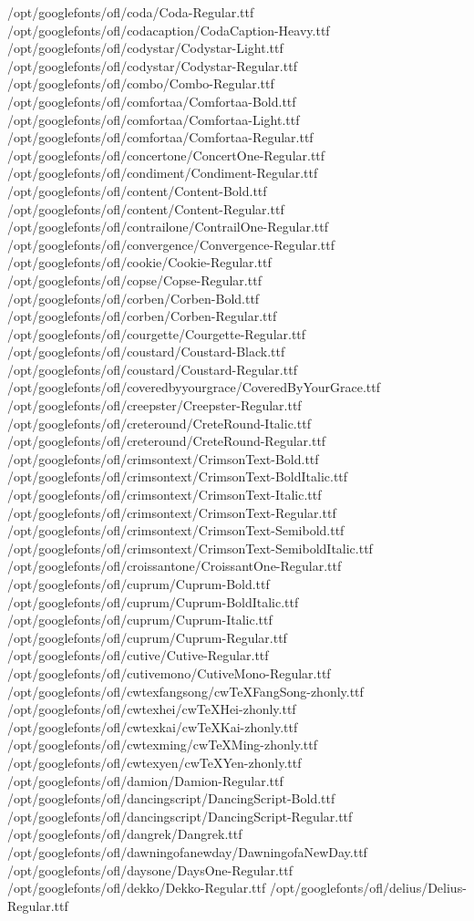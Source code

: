 /opt/googlefonts/ofl/coda/Coda-Regular.ttf
/opt/googlefonts/ofl/codacaption/CodaCaption-Heavy.ttf
/opt/googlefonts/ofl/codystar/Codystar-Light.ttf
/opt/googlefonts/ofl/codystar/Codystar-Regular.ttf
/opt/googlefonts/ofl/combo/Combo-Regular.ttf
/opt/googlefonts/ofl/comfortaa/Comfortaa-Bold.ttf
/opt/googlefonts/ofl/comfortaa/Comfortaa-Light.ttf
/opt/googlefonts/ofl/comfortaa/Comfortaa-Regular.ttf
/opt/googlefonts/ofl/concertone/ConcertOne-Regular.ttf
/opt/googlefonts/ofl/condiment/Condiment-Regular.ttf
/opt/googlefonts/ofl/content/Content-Bold.ttf
/opt/googlefonts/ofl/content/Content-Regular.ttf
/opt/googlefonts/ofl/contrailone/ContrailOne-Regular.ttf
/opt/googlefonts/ofl/convergence/Convergence-Regular.ttf
/opt/googlefonts/ofl/cookie/Cookie-Regular.ttf
/opt/googlefonts/ofl/copse/Copse-Regular.ttf
/opt/googlefonts/ofl/corben/Corben-Bold.ttf
/opt/googlefonts/ofl/corben/Corben-Regular.ttf
/opt/googlefonts/ofl/courgette/Courgette-Regular.ttf
/opt/googlefonts/ofl/coustard/Coustard-Black.ttf
/opt/googlefonts/ofl/coustard/Coustard-Regular.ttf
/opt/googlefonts/ofl/coveredbyyourgrace/CoveredByYourGrace.ttf
/opt/googlefonts/ofl/creepster/Creepster-Regular.ttf
/opt/googlefonts/ofl/creteround/CreteRound-Italic.ttf
/opt/googlefonts/ofl/creteround/CreteRound-Regular.ttf
/opt/googlefonts/ofl/crimsontext/CrimsonText-Bold.ttf
/opt/googlefonts/ofl/crimsontext/CrimsonText-BoldItalic.ttf
/opt/googlefonts/ofl/crimsontext/CrimsonText-Italic.ttf
/opt/googlefonts/ofl/crimsontext/CrimsonText-Regular.ttf
/opt/googlefonts/ofl/crimsontext/CrimsonText-Semibold.ttf
/opt/googlefonts/ofl/crimsontext/CrimsonText-SemiboldItalic.ttf
/opt/googlefonts/ofl/croissantone/CroissantOne-Regular.ttf
/opt/googlefonts/ofl/cuprum/Cuprum-Bold.ttf
/opt/googlefonts/ofl/cuprum/Cuprum-BoldItalic.ttf
/opt/googlefonts/ofl/cuprum/Cuprum-Italic.ttf
/opt/googlefonts/ofl/cuprum/Cuprum-Regular.ttf
/opt/googlefonts/ofl/cutive/Cutive-Regular.ttf
/opt/googlefonts/ofl/cutivemono/CutiveMono-Regular.ttf
/opt/googlefonts/ofl/cwtexfangsong/cwTeXFangSong-zhonly.ttf
/opt/googlefonts/ofl/cwtexhei/cwTeXHei-zhonly.ttf
/opt/googlefonts/ofl/cwtexkai/cwTeXKai-zhonly.ttf
/opt/googlefonts/ofl/cwtexming/cwTeXMing-zhonly.ttf
/opt/googlefonts/ofl/cwtexyen/cwTeXYen-zhonly.ttf
/opt/googlefonts/ofl/damion/Damion-Regular.ttf
/opt/googlefonts/ofl/dancingscript/DancingScript-Bold.ttf
/opt/googlefonts/ofl/dancingscript/DancingScript-Regular.ttf
/opt/googlefonts/ofl/dangrek/Dangrek.ttf
/opt/googlefonts/ofl/dawningofanewday/DawningofaNewDay.ttf
/opt/googlefonts/ofl/daysone/DaysOne-Regular.ttf
/opt/googlefonts/ofl/dekko/Dekko-Regular.ttf
/opt/googlefonts/ofl/delius/Delius-Regular.ttf
